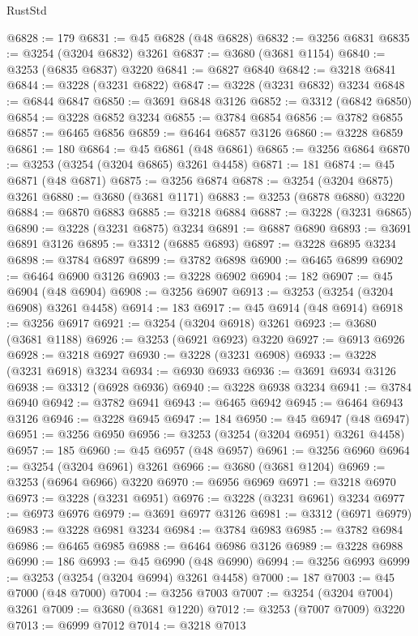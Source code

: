\begin{lexlean}{RustStd}
\begin{coremodule}
{\begin{coremodule}
{{{{{{{{{{{{{{{{{{{{{{{{{{{{{{{{{{{{{@6828 := 179
@6831 := @45 @6828 (@48 @6828)
@6832 := @3256 @6831
@6835 := @3254 (@3204 @6832) @3261
@6837 := @3680 (@3681 @1154)
@6840 := @3253 (@6835 @6837) @3220
@6841 := @6827 @6840
@6842 := @3218 @6841
@6844 := @3228 (@3231 @6822)
@6847 := @3228 (@3231 @6832) @3234
@6848 := @6844 @6847
@6850 := @3691 @6848 @3126
@6852 := @3312 (@6842 @6850)
@6854 := @3228 @6852 @3234
@6855 := @3784 @6854
@6856 := @3782 @6855
@6857 := @6465 @6856
@6859 := @6464 @6857 @3126
@6860 := @3228 @6859
@6861 := 180
@6864 := @45 @6861 (@48 @6861)
@6865 := @3256 @6864
@6870 := @3253 (@3254 (@3204 @6865) @3261 @4458)
@6871 := 181
@6874 := @45 @6871 (@48 @6871)
@6875 := @3256 @6874
@6878 := @3254 (@3204 @6875) @3261
@6880 := @3680 (@3681 @1171)
@6883 := @3253 (@6878 @6880) @3220
@6884 := @6870 @6883
@6885 := @3218 @6884
@6887 := @3228 (@3231 @6865)
@6890 := @3228 (@3231 @6875) @3234
@6891 := @6887 @6890
@6893 := @3691 @6891 @3126
@6895 := @3312 (@6885 @6893)
@6897 := @3228 @6895 @3234
@6898 := @3784 @6897
@6899 := @3782 @6898
@6900 := @6465 @6899
@6902 := @6464 @6900 @3126
@6903 := @3228 @6902
@6904 := 182
@6907 := @45 @6904 (@48 @6904)
@6908 := @3256 @6907
@6913 := @3253 (@3254 (@3204 @6908) @3261 @4458)
@6914 := 183
@6917 := @45 @6914 (@48 @6914)
@6918 := @3256 @6917
@6921 := @3254 (@3204 @6918) @3261
@6923 := @3680 (@3681 @1188)
@6926 := @3253 (@6921 @6923) @3220
@6927 := @6913 @6926
@6928 := @3218 @6927
@6930 := @3228 (@3231 @6908)
@6933 := @3228 (@3231 @6918) @3234
@6934 := @6930 @6933
@6936 := @3691 @6934 @3126
@6938 := @3312 (@6928 @6936)
@6940 := @3228 @6938 @3234
@6941 := @3784 @6940
@6942 := @3782 @6941
@6943 := @6465 @6942
@6945 := @6464 @6943 @3126
@6946 := @3228 @6945
@6947 := 184
@6950 := @45 @6947 (@48 @6947)
@6951 := @3256 @6950
@6956 := @3253 (@3254 (@3204 @6951) @3261 @4458)
@6957 := 185
@6960 := @45 @6957 (@48 @6957)
@6961 := @3256 @6960
@6964 := @3254 (@3204 @6961) @3261
@6966 := @3680 (@3681 @1204)
@6969 := @3253 (@6964 @6966) @3220
@6970 := @6956 @6969
@6971 := @3218 @6970
@6973 := @3228 (@3231 @6951)
@6976 := @3228 (@3231 @6961) @3234
@6977 := @6973 @6976
@6979 := @3691 @6977 @3126
@6981 := @3312 (@6971 @6979)
@6983 := @3228 @6981 @3234
@6984 := @3784 @6983
@6985 := @3782 @6984
@6986 := @6465 @6985
@6988 := @6464 @6986 @3126
@6989 := @3228 @6988
@6990 := 186
@6993 := @45 @6990 (@48 @6990)
@6994 := @3256 @6993
@6999 := @3253 (@3254 (@3204 @6994) @3261 @4458)
@7000 := 187
@7003 := @45 @7000 (@48 @7000)
@7004 := @3256 @7003
@7007 := @3254 (@3204 @7004) @3261
@7009 := @3680 (@3681 @1220)
@7012 := @3253 (@7007 @7009) @3220
@7013 := @6999 @7012
@7014 := @3218 @7013
}}}}}}}}}}}}}}}}}}}}}}}}}}}}}}}}}}}}}
\end{coremodule}}
\end{coremodule}
\end{lexlean}
